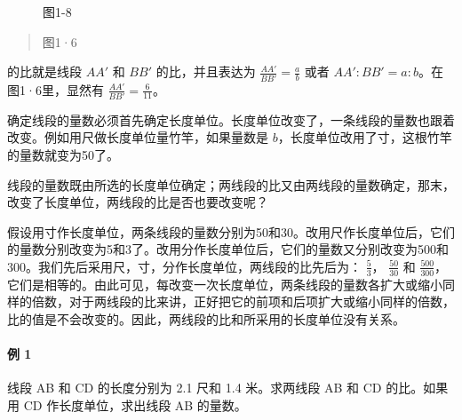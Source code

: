 \begin{figure}
\centering
{}
\caption{图1-8}
\end{figure}

\begin{quote}
图1·6
\end{quote}

的比就是线段 \(AA'\) 和 \(BB'\) 的比，并且表达为
\(\frac{AA'}{BB'} = \frac{a}{b}\) 或者
\(AA':BB' = a:b\)。在图1·6里，显然有
\(\frac{AA'}{BB'} = \frac{6}{11}\)。

确定线段的量数必须首先确定长度单位。长度单位改变了，一条线段的量数也跟着改变。例如用尺做长度单位量竹竿，如果量数是
\(b\)，长度单位改用了寸，这根竹竿的量数就变为50了。

线段的量数既由所选的长度单位确定；两线段的比又由两线段的量数确定，那末，改变了长度单位，两线段的比是否也要改变呢？

假设用寸作长度单位，两条线段的量数分别为50和30。改用尺作长度单位后，它们的量数分别改变为5和3了。改用分作长度单位后，它们的量数又分别改变为500和300。我们先后采用尺，寸，分作长度单位，两线段的比先后为：
\(\frac{5}{3}\)， \(\frac{50}{30}\) 和
\(\frac{500}{300}\)，它们是相等的。由此可见，每改变一次长度单位，两条线段的量数各扩大或缩小同样的倍数，对于两线段的比来讲，正好把它的前项和后项扩大或缩小同样的倍数，比的值是不会改变的。因此，两线段的比和所采用的长度单位没有关系。

\paragraph{例 1}

线段 AB 和 CD 的长度分别为 2.1 尺和 1.4 米。求两线段 AB 和 CD
的比。如果用 CD 作长度单位，求出线段 AB 的量数。

